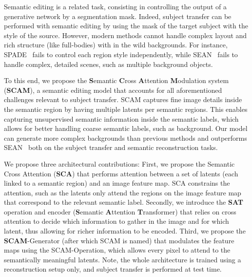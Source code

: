 \documentclass[runningheads]{llncs}
\makeatletter
\newcommand{\mname}{SCAM\@\xspace}
\makeatother
\begin{document}
Semantic editing is a related task, consisting in controlling the output of a generative network by a segmentation mask. Indeed, subject transfer can be performed with semantic editing by using the mask of the target subject with the style of the source. 
However, modern methods cannot handle complex layout and rich structure (like full-bodies) with in the wild backgrounds. 
For instance, SPADE~\cite{park2019semantic} fails to control each region style independently, while SEAN~\cite{Zhu_2020} fails to handle complex, detailed scenes, such as multiple background objects.








To this end, we propose the \textbf{S}emantic \textbf{C}ross \textbf{A}ttention \textbf{M}odulation system (\textbf{\mname}), a semantic editing model that accounts for all aforementioned challenges relevant to subject transfer. 
\mname captures fine image details inside the semantic region by having multiple latents per semantic regions. This enables capturing unsupervised semantic information inside the semantic labels, which allows for better handling coarse semantic labels, such as  background. Our model can generate more complex backgrounds than previous methods and outperforms SEAN~\cite{Zhu_2020} both on the subject transfer and semantic reconstruction tasks.
 




We propose three architectural contributions: 
First, we propose the Semantic Cross Attention (\textbf{SCA}) that performs attention between a set of latents (each linked to a semantic region) and an image feature map. SCA constrains the attention, such as the latents only attend the regions on the image feature map that correspond to the relevant semantic label. 
Secondly, we introduce the \textbf{SAT} operation and encoder (\textbf{S}emantic \textbf{A}ttention \textbf{T}ransformer) that relies on cross attention to decide which information to gather in the image and for which latent, thus allowing for richer information to be encoded. 
Third, we propose the \textbf{SCAM}-Generator (after which \mname is named) that modulates the feature maps using the SCAM-Operation, which allows every pixel to attend to the semantically meaningful latents. Note, the whole architecture is trained using a reconstruction setup only, and subject transfer is performed at test time.
\end{document}
